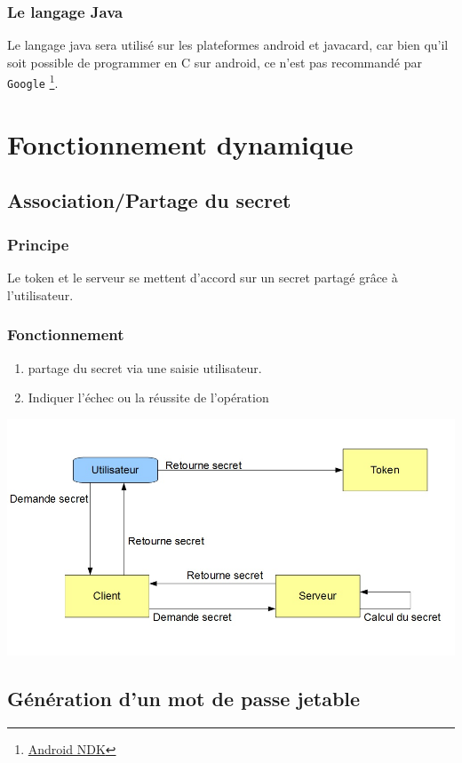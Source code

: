 \documentclass{"../../res/univ-projet"}
\begin{document}
\subsubsection{Le langage Java}
    Le langage java sera utilis\'e sur les plateformes android
    et javacard, car bien qu'il soit possible de programmer en C
    sur android, ce n'est pas recommand\'e par \verb?Google?
    \footnote{\href{https://developer.android.com/tools/sdk/ndk/index.html}{Android NDK}}.
        
\section{Fonctionnement dynamique}
\subsection{Association/Partage du secret}
\subsubsection{Principe}
Le token et le serveur se mettent d'accord sur un secret partag\'e gr\^ace à l'utilisateur.

\subsubsection{Fonctionnement}
\begin{enumerate}
    \item partage du secret via une saisie utilisateur.
    \item Indiquer l'échec ou la réussite de l'opération
\end{enumerate}
\includegraphics[width=\textwidth]{../association.jpg}

\subsection{Génération d'un mot de passe jetable}
\end{document}
